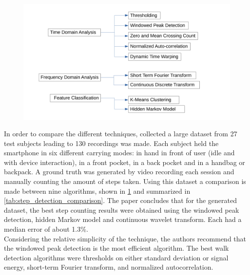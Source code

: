 \begin{figure}[]
	\centering
	\includegraphics[trim=0 15 0 20, clip,width=0.7\linewidth]{images/step_detection_options}
	\caption{}
	\label{fig:step_detection_options}
\end{figure}

In order to compare the different techniques, \citet{Brajdic2013} collected a large dataset from 27 test subjects leading to 130 recordings was made. Each subject held the smartphone in six different carrying modes: in 
hand in front of user (idle and with device interaction), in a front pocket, in a back pocket and in a handbag or backpack. A ground truth was generated by video recording each session and manually counting the amount of steps taken. Using this dataset a comparison is made between nine algorithms, shown in \cref{fig:step_detection_options} and summarized in \cref{tab:step_detection_comparison}. 
\newline
The paper concludes that for the generated dataset, the best step counting results were obtained using the windowed peak detection, hidden Markov model and continuous wavelet transform. Each had a median error of about 1.3\%.\\
Considering the relative simplicity of the technique, the authors recommend that the windowed peak detection is the most efficient algorithm. The best walk detection algorithms were thresholds on either standard deviation or signal energy,  short-term Fourier transform, and normalized autocorrelation.\\
